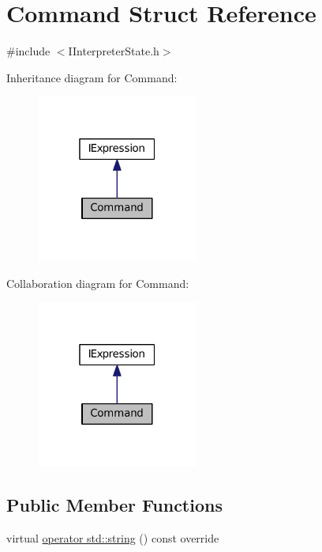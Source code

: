 \hypertarget{struct_command}{}\section{Command Struct Reference}
\label{struct_command}


{\ttfamily \#include $<$I\+Interpreter\+State.\+h$>$}



Inheritance diagram for Command\+:
\nopagebreak
\begin{figure}[H]
\begin{center}
\leavevmode
\includegraphics[width=151pt]{struct_command__inherit__graph}
\end{center}
\end{figure}


Collaboration diagram for Command\+:
\nopagebreak
\begin{figure}[H]
\begin{center}
\leavevmode
\includegraphics[width=151pt]{struct_command__coll__graph}
\end{center}
\end{figure}
\subsection*{Public Member Functions}
\begin{DoxyCompactItemize}
\item 
virtual \hyperlink{struct_command_ae4fd05a91d2e11794bd6427aa37b8c77}{operator std\+::string} () const override
\end{DoxyCompactItemize}
